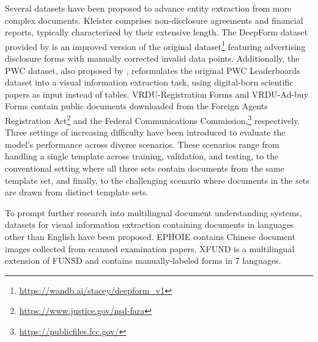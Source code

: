 Several datasets have been proposed to advance entity extraction from more complex documents. Kleister \citep{gralinski2020kleister} comprises non-disclosure agreements and financial reports, typically characterized by their extensive length. The DeepForm dataset provided by \citet{borchmann2021due} is an improved version of the original dataset\footnote{\url{https://wandb.ai/stacey/deepform_v1}} featuring advertising disclosure forms with manually corrected invalid data points. Additionally, the PWC dataset, also proposed by \citet{borchmann2021due}, reformulates the original PWC Leaderboards dataset \citep{kardas2020axcell} into a visual information extraction task, using digital-born scientific papers as input instead of tables. VRDU-Registration Forms and VRDU-Ad-buy Forms \citep{wang2023vrdu} contain public documents downloaded from the Foreign Agents Registration Act\footnote{\url{https://www.justice.gov/nsd-fara}} and the Federal Communications Commission,\footnote{\url{https://publicfiles.fcc.gov/}} respectively. Three settings of increasing difficulty have been introduced to evaluate the model's performance across diverse scenarios. These scenarios range from handling a single template across training, validation, and testing, to the conventional setting where all three sets contain documents from the same template set, and finally, to the challenging scenario where documents in the sets are drawn from distinct template sets. 

To prompt further research into multilingual document understanding systems, datasets for visual information extraction containing documents in languages other than English have been proposed. EPHOIE \citep{wang2021towards} contains Chinese document images collected from scanned examination papers. XFUND is a multilingual extension of \ac{FUNSD} \citep{xu-etal-2022-xfund} and contains manually-labeled forms in 7 languages.




